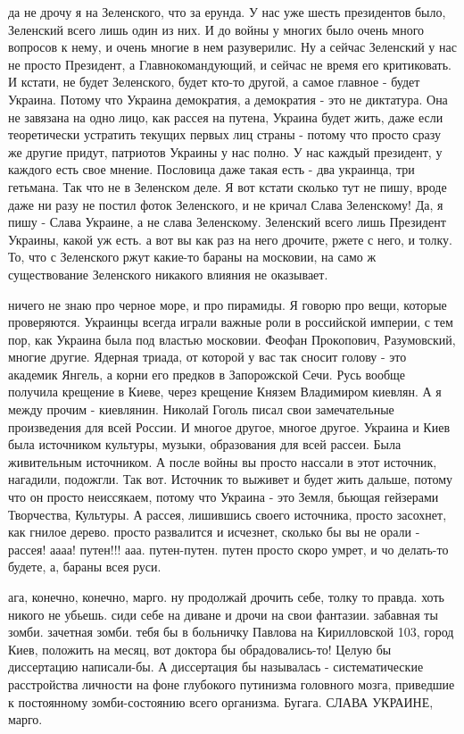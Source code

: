 да не дрочу я на Зеленского, что за ерунда. У нас уже шесть президентов было,
Зеленский всего лишь один из них. И до войны у многих было очень много вопросов
к нему, и очень многие в нем разуверилис. Ну а сейчас Зеленский у нас не просто
Президент, а Главнокомандующий, и сейчас не время его критиковать. И кстати, не
будет Зеленского, будет кто-то другой, а самое главное - будет Украина. Потому
что Украина демократия, а демократия - это не диктатура. Она не завязана на
одно лицо, как рассея на путена, Украина будет жить, даже если теоретически
устратить текущих первых лиц страны - потому что просто сразу же другие придут,
патриотов Украины у нас полно. У нас каждый президент, у каждого есть свое
мнение. Пословица даже такая есть - два украинца, три гетьмана. Так что не в
Зеленском деле. Я вот кстати сколько тут не пишу, вроде даже ни разу не постил
фоток Зеленского, и не кричал Слава Зеленскому! Да, я пишу - Слава Украине, а
не слава Зеленскому. Зеленский всего лишь Президент Украины, какой уж есть. а
вот вы как раз на него дрочите, ржете с него, и толку. То, что с Зеленского
ржут какие-то бараны на московии, на само ж существование Зеленского никакого
влияния не оказывает.

ничего не знаю про черное море, и про пирамиды. Я говорю про вещи, которые
проверяются. Украинцы всегда играли важные роли в российской империи, с тем
пор, как Украина была под властью московии. Феофан Прокопович, Разумовский,
многие другие. Ядерная триада, от которой у вас так сносит голову - это
академик Янгель, а корни его предков в Запорожской Сечи. Русь вообще получила
крещение в Киеве, через крещение Князем Владимиром киевлян. А я между прочим -
киевлянин. Николай Гоголь писал свои замечательные произведения для всей
России. И многое другое, многое другое. Украина и Киев была источником
культуры, музыки, образования для всей рассеи. Была живительным источником. А
после войны вы просто нассали в этот источник, нагадили, подожгли. Так вот.
Источник то выживет и будет жить дальше, потому что он просто неиссякаем,
потому что Украина - это Земля, бьющая гейзерами Творчества, Культуры. А
рассея, лишившись своего источника, просто засохнет, как гнилое дерево. просто
развалится и исчезнет, сколько бы вы не орали - рассея! аааа! путен!!! ааа.
путен-путен. путен просто скоро умрет, и чо делать-то будете, а, бараны всея
руси.

ага, конечно, конечно, марго. ну продолжай дрочить себе, толку то правда. хоть
никого не убьешь. сиди себе на диване и дрочи на свои фантазии. забавная ты
зомби. зачетная зомби. тебя бы в больничку Павлова на Кирилловской 103, город
Киев, положить на месяц, вот доктора бы обрадовались-то! Целую бы диссертацию
написали-бы. А диссертация бы называлась - систематические расстройства
личности на фоне глубокого путинизма головного мозга, приведшие к постоянному
зомби-состоянию всего организма. Бугага. СЛАВА УКРАИНЕ, марго.


